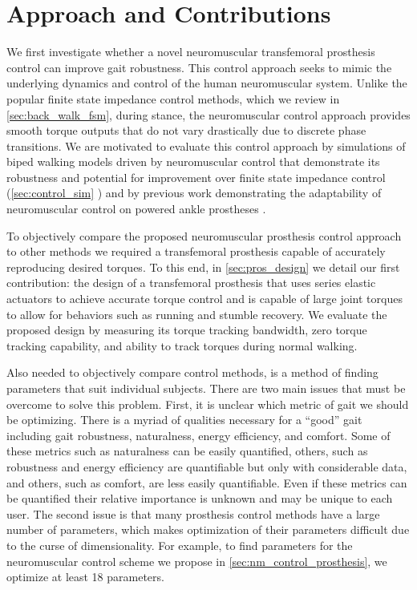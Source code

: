\section{Approach and Contributions}\label{sec:intro_approach_contrib} 

We first investigate whether a novel neuromuscular transfemoral prosthesis
control can improve gait robustness. This control approach seeks to mimic the
underlying dynamics and control of the human neuromuscular system. Unlike the
popular finite state impedance control methods, which we review in
\cref{sec:back_walk_fsm}, during stance, the neuromuscular control approach
provides smooth torque outputs that do not vary drastically due to discrete
phase transitions.  We are motivated to evaluate this control approach by
simulations of biped walking models driven by neuromuscular control that
demonstrate its robustness \citep{song2013integration,song2015neural} and
potential for improvement over finite state impedance control
(\cref{sec:control_sim} \citep{thatte2016toward}) and by previous work
demonstrating the adaptability of neuromuscular control on powered ankle
prostheses \citep{eilenberg2010control,markowitz2011speed}.

To objectively compare the proposed neuromuscular prosthesis control approach to
other methods we required a transfemoral prosthesis capable of accurately
reproducing desired torques. To this end, in \cref{sec:pros_design} we detail
our first contribution: the design of a transfemoral prosthesis that uses series
elastic actuators to achieve accurate torque control and is capable of large
joint torques to allow for behaviors such as running and stumble recovery.  We
evaluate the proposed design by measuring its torque tracking bandwidth, zero
torque tracking capability, and ability to track torques during normal walking.

Also needed to objectively compare control methods, is a method of finding
parameters that suit individual subjects. There are two main issues that must be
overcome to solve this problem. First, it is unclear which metric of gait we
should be optimizing. There is a myriad of qualities necessary for a ``good''
gait including gait robustness, naturalness, energy efficiency, and comfort.
Some of these metrics such as naturalness can be easily quantified, others, such
as robustness and energy efficiency are quantifiable but only with considerable
data, and others, such as comfort, are less easily quantifiable. Even if these
metrics can be quantified their relative importance is unknown and may be unique
to each user. The second issue is that many prosthesis control methods have a
large number of parameters, which makes optimization of their parameters
difficult due to the curse of dimensionality. For example, to find parameters
for the neuromuscular control scheme we propose in 
\cref{sec:nm_control_prosthesis}, we optimize at least 18 parameters.

